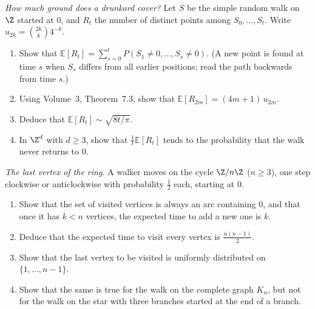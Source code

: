 \begin{exercise}[$\star\star$]\label{pb:range}
\emph{How much ground does a drunkard cover?} Let $S$ be the simple random walk on $\Z$ started at $0$, and $R_t$ the number of distinct
points among $S_0,\dots,S_t$. Write $u_{2k}=\binom{2k}k4^{-k}$.
\begin{enumerate}[label=(\alph*)]
\item Show that $\mathbb E[R_t]=\sum_{s=0}^tP(S_1\ne0,\dots,S_s\ne0)$. (A new point is found at time $s$ when $S_s$ differs from all earlier positions; read the path backwards
from time $s$.)
\item Using Volume~3, Theorem~7.3, show that $\mathbb E[R_{2m}]=(4m+1)\,u_{2m}$.
\item Deduce that $\mathbb E[R_t]\sim\sqrt{8t/\pi}$.
\item In $\Z^d$ with $d\ge3$, show that $\frac1t\mathbb E[R_t]$ tends to the probability that the walk never returns to $0$.
\end{enumerate}
\end{exercise}

\begin{exercise}[$\star\star$]\label{pb:cyclecover}
\emph{The last vertex of the ring.} A walker moves on the cycle $\Z/n\Z$ ($n\ge3$), one step clockwise or anticlockwise with probability
$\frac12$ each, starting at $0$.
\begin{enumerate}[label=(\alph*)]
\item Show that the set of visited vertices is always an arc containing $0$, and that once it has $k<n$ vertices, the expected
time to add a new one is $k$.
\item Deduce that the expected time to visit every vertex is $\frac{n(n-1)}2$.
\item Show that the last vertex to be visited is uniformly distributed on $\{1,\dots,n-1\}$.
\item Show that the same is true for the walk on the complete graph $K_n$, but not for the walk on the star with three branches
started at the end of a branch.
\end{enumerate}
\end{exercise}

